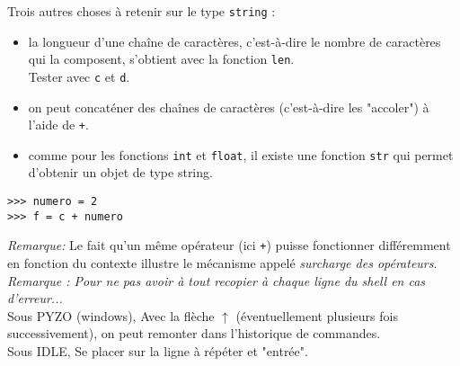 \begin{multicols}{2}
Trois autres choses à retenir sur le type \texttt{string} : 
\begin{itemize}
\item la longueur d'une chaîne de caractères, c'est-à-dire le nombre de caractères qui la composent, s'obtient avec la fonction \texttt{len}.\\ Tester avec \texttt{c} et \texttt{d}.
\item on peut concaténer des chaînes de caractères (c'est-à-dire les "accoler") à l'aide de \texttt{+}.
\item comme pour les fonctions \texttt{int} et \texttt{float}, il existe une fonction \texttt{str} qui permet d'obtenir un objet de type string.\\
\end{itemize}


\begin{lstlisting}
>>> numero = 2
>>> f = c + numero
\end{lstlisting}

\emph{Remarque:} Le fait qu'un même opérateur (ici \texttt{+}) puisse fonctionner différemment en fonction du contexte illustre le mécanisme appelé \emph{surcharge des opérateurs}.\\



\emph{Remarque : Pour ne pas avoir à tout recopier à chaque ligne du shell en cas d'erreur...}\\
Sous PYZO (windows), Avec la flèche $\uparrow$ (éventuellement plusieurs fois successivement), on peut remonter dans l'historique de commandes.\\
Sous IDLE, Se placer sur la ligne à répéter et "entrée".





\ifprof
\else
\end{multicols}
\fi

